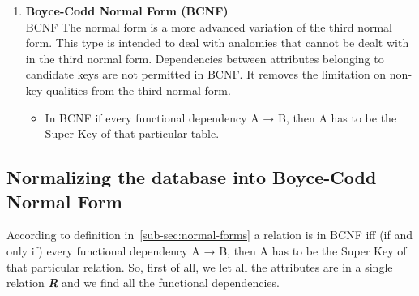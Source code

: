 \begin{enumerate}
\item \textbf{Boyce-Codd Normal Form (BCNF)}\\
BCNF The normal form is a more advanced variation of the third normal form. This type is intended to deal with analomies that cannot be dealt with in the third normal form. Dependencies between attributes belonging to candidate keys are not permitted in BCNF. It removes the limitation on non-key qualities from the third normal form. 
\begin{itemize}
\item In BCNF if every functional dependency A → B, then A has to be the Super Key of that particular table.
\end{itemize}
\end{enumerate}

\subsection{Normalizing the database into Boyce-Codd Normal Form}\label{sub-sec:normalizing-bcnf}
According to definition in~\ref{sub-sec:normal-forms} a relation is in BCNF iff (if and only if) every functional dependency A → B, then A has to be the Super Key of that particular relation. So, first of all, we let all the attributes are in a single relation \textbf{\emph{R}} and we find all the functional dependencies.

